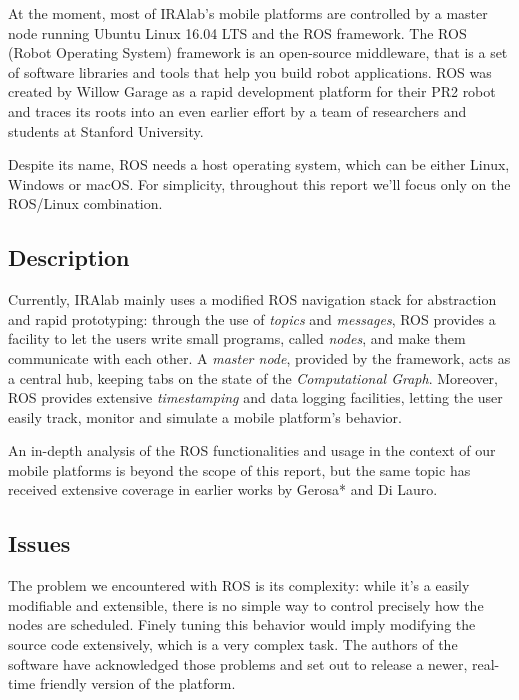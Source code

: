 \documentclass[a4paper,12pt]{report}
\begin{document}
At the moment, most of IRAlab's mobile platforms are controlled by a master node running Ubuntu Linux 16.04 LTS and the ROS framework. The ROS (Robot Operating System) framework is an open-source middleware, that is a set of software libraries and tools that help you build robot applications. ROS was created by Willow Garage as a rapid development platform for their PR2 robot and traces its roots into an even earlier effort by a team of researchers and students at Stanford University.

Despite its name, ROS needs a host operating system, which can be either Linux, Windows or macOS. For simplicity, throughout this report we'll focus only on the ROS/Linux combination.

\subsection{Description}

Currently, IRAlab mainly uses a modified ROS navigation stack for abstraction and rapid prototyping: through the use of \textit{topics} and \textit{messages}, ROS provides a facility to let the users write small programs, called \textit{nodes}, and make them communicate with each other. A \textit{master node}, provided by the framework, acts as a central hub, keeping tabs on the state of the \textit{Computational Graph}. Moreover, ROS provides extensive \textit{timestamping} and data logging facilities, letting the user easily track, monitor and simulate a mobile platform's behavior.

An in-depth analysis of the ROS functionalities and usage in the context of our mobile platforms is beyond the scope of this report, but the same topic has received extensive coverage in earlier works by Gerosa* and Di Lauro\cite{fdila-bs-otto}.

\subsection{Issues}

The problem we encountered with ROS is its complexity: while it's a easily modifiable and extensible, there is no simple way to control precisely how the nodes are scheduled. Finely tuning this behavior would imply modifying the source code extensively, which is a very complex task. The authors of the software have acknowledged those problems and set out to release a newer, real-time friendly version of the platform\cite{ros2-realtime-intro}.
\end{document}
